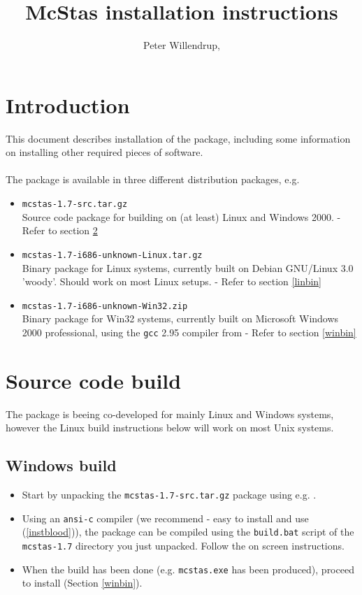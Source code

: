 \documentclass[a4paper,12pt]{article}
\title{McStas installation instructions}
\author{Peter
  Willendrup,\\\htmladdnormallink{peter.willendrup@risoe.dk}{mailto:peter.willendrup@risoe.dk}}
\begin{document}
\maketitle
\section{Introduction}
This document describes installation of the
 package, including
some information on installing other required pieces of software.\\\ \\The {} package is
available in three different distribution packages, e.g.
\begin{itemize}
\item{\texttt{mcstas-1.7-src.tar.gz}\\Source code package for
    building  on
  (at least) Linux and Windows 2000. - Refer to section \ref{src}}
\item{\texttt{mcstas-1.7-i686-unknown-Linux.tar.gz}\\Binary package
  for Linux systems, currently built on Debian GNU/Linux 3.0 'woody'. 
  Should work on most Linux setups.
 - Refer to section \ref{linbin}}
\item{\texttt{mcstas-1.7-i686-unknown-Win32.zip}\\Binary package
  for Win32 systems, currently built on Microsoft Windows 2000
  professional, using the \texttt{gcc} 2.95 compiler from 
   - Refer to section \ref{winbin}}
\end{itemize}
\section{Source code build}
\label{src}
The  package is
beeing co-developed for mainly Linux and Windows systems, however 
the Linux build instructions below will work on most Unix systems.
\subsection{Windows build}
\begin{itemize}
\item{Start by unpacking the \texttt{mcstas-1.7-src.tar.gz} package using
e.g. .}
\item{Using an \texttt{ansi-c} compiler (we recommend
 - easy to install
and use (\ref{instblood})), the
 package can be
compiled using the \texttt{build.bat} script of the
\texttt{mcstas-1.7} directory you just unpacked. Follow the on screen
instructions.} 
\item{When the build has been done (e.g. \texttt{mcstas.exe}
has been produced), proceed to install (Section \ref{winbin}).}
\end{itemize}
\end{document}
